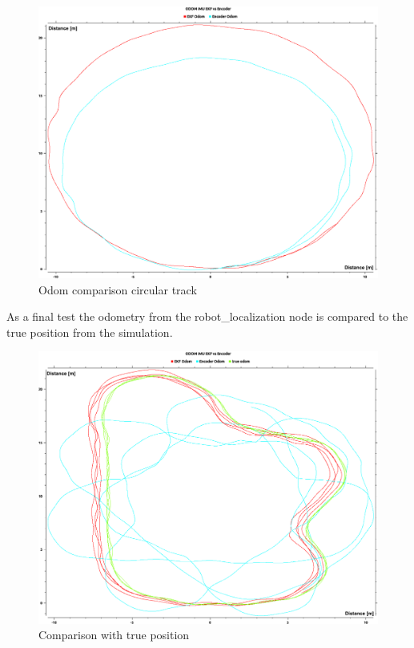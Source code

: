 \begin{figure} 
	\includegraphics[width=\textwidth]{Pictures/circle odom}
	\caption{Odom comparison circular track}
	\label{circular track}

\end{figure}

As a final test the odometry from the robot\_localization node is compared to the true position from the simulation.

 \begin{figure} 
	\includegraphics[width=\textwidth]{Pictures/odom with true}
	\caption{Comparison with true position}
	\label{trueodom}
\end{figure}

